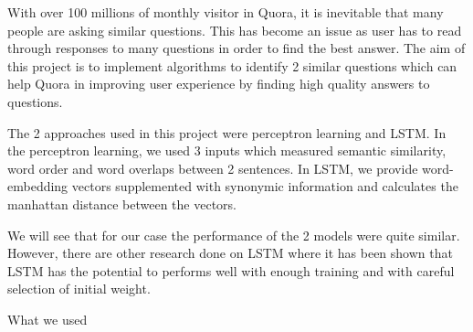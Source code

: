With over 100 millions of monthly visitor in Quora, it is inevitable that many people are asking similar questions. This has become an issue as user has to read through responses to many questions in order to find the best answer. The aim of this project is to implement algorithms to identify 2 similar questions which can help Quora in improving user experience by finding high quality answers to questions.

The 2 approaches used in this project were perceptron learning and LSTM. In the perceptron learning, we used 3 inputs which measured semantic similarity, word order and word overlaps between 2 sentences. In LSTM, we provide word-embedding vectors supplemented with synonymic information and calculates the manhattan distance between the vectors.

We will see that for our case the performance of the 2 models were quite similar. However, there are other research done on LSTM where it has been shown that LSTM has the potential to performs well with enough training and with careful selection of initial weight.

What we used